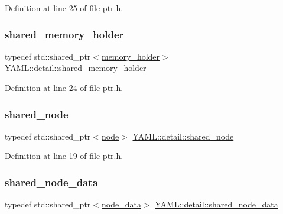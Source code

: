 Definition at line 25 of file ptr.\+h.

\mbox{\label{namespace_y_a_m_l_1_1detail_a228c4b3b6ba1058b474d40afc218e21d}} 
\subsubsection{\texorpdfstring{shared\_memory\_holder}{shared\_memory\_holder}}
{\footnotesize\ttfamily typedef std\+::shared\+\_\+ptr$<$\mbox{\hyperlink{class_y_a_m_l_1_1detail_1_1memory__holder}{memory\+\_\+holder}}$>$ \mbox{\hyperlink{namespace_y_a_m_l_1_1detail_a228c4b3b6ba1058b474d40afc218e21d}{Y\+A\+M\+L\+::detail\+::shared\+\_\+memory\+\_\+holder}}}



Definition at line 24 of file ptr.\+h.

\mbox{\label{namespace_y_a_m_l_1_1detail_a82d0adac71c8c40ff49ceafad19dda7b}} 
\subsubsection{\texorpdfstring{shared\_node}{shared\_node}}
{\footnotesize\ttfamily typedef std\+::shared\+\_\+ptr$<$\mbox{\hyperlink{class_y_a_m_l_1_1detail_1_1node}{node}}$>$ \mbox{\hyperlink{namespace_y_a_m_l_1_1detail_a82d0adac71c8c40ff49ceafad19dda7b}{Y\+A\+M\+L\+::detail\+::shared\+\_\+node}}}



Definition at line 19 of file ptr.\+h.

\mbox{\label{namespace_y_a_m_l_1_1detail_a1297ce8286b487d590995aab71142019}} 
\subsubsection{\texorpdfstring{shared\_node\_data}{shared\_node\_data}}
{\footnotesize\ttfamily typedef std\+::shared\+\_\+ptr$<$\mbox{\hyperlink{class_y_a_m_l_1_1detail_1_1node__data}{node\+\_\+data}}$>$ \mbox{\hyperlink{namespace_y_a_m_l_1_1detail_a1297ce8286b487d590995aab71142019}{Y\+A\+M\+L\+::detail\+::shared\+\_\+node\+\_\+data}}}



